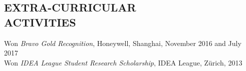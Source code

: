 \documentclass[margin, 10pt]{res} %
\begin{document}
\begin{resume}
\begin{CJK}{UTF8}{gbsn}
\section{EXTRA-CURRICULAR \\ ACTIVITIES} 
Won {\it Bravo Gold Recognition}, Honeywell, Shanghai, November 2016 and July 2017 \\
Won {\it IDEA League Student Research Scholarship}, IDEA League, Zürich, 2013 \\

\end{CJK}
\end{resume}
\end{document}
